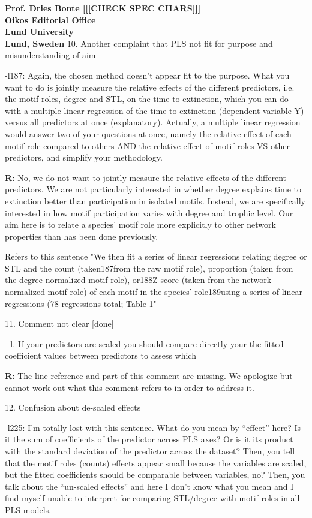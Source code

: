 \documentclass[12pt]{letter}
\begin{document}
\begin{letter}{\bf Prof. Dries Bonte [[[CHECK SPEC CHARS]]]\\
Oikos Editorial Office \\
Lund University \\
Lund, Sweden}
    10. Another complaint that PLS not fit for purpose and misunderstanding of aim

      -l187: Again, the chosen method doesn’t appear fit to the purpose. What you want to do is jointly measure the relative effects of the different predictors, i.e. the motif roles, degree and STL, on the time to extinction, which you can do with a multiple linear regression of the time to extinction (dependent variable Y) versus all predictors at once (explanatory). Actually, a multiple linear regression would answer two of your questions at once, namely the relative effect of each motif role compared to others AND the relative effect of motif roles VS other predictors, and simplify your methodology.
      
      \textbf{R:} No, we do not want to jointly measure the relative effects of the different predictors. We are not particularly interested in whether degree explains time to extinction better than participation in isolated motifs. Instead, we are specifically interested in how motif participation varies with degree and trophic level. Our aim here is to relate a species' motif role more explicitly to other network properties than has been done previously.

      Refers to this sentence "We then fit a series of linear regressions relating degree or STL and the count (taken187from the raw motif role), proportion (taken from the degree-normalized motif role), or188Z-score (taken from the network-normalized motif role) of each motif in the species’ role189using a series of linear regressions (78 regressions total; Table 1"


    11. Comment not clear [done]

      - l. If your predictors are scaled you should compare directly your the fitted coefficient values between predictors to assess which

      \textbf{R:} The line reference and part of this comment are missing. We apologize but cannot work out what this comment refers to in order to address it.


    12. Confusion about de-scaled effects

      -l225: I’m totally lost with this sentence. What do you mean by “effect” here? Is it the sum of coefficients of the predictor across PLS axes? Or is it its product with the standard deviation of the predictor across the dataset? Then, you tell that the motif roles (counts) effects appear small because the variables are scaled, but the fitted coefficients should be comparable between variables, no?  Then, you talk about the “un-scaled effects” and here I don’t know what you mean and I find myself unable to interpret for comparing STL/degree with motif roles in all PLS models.


\end{letter}
\end{document}
